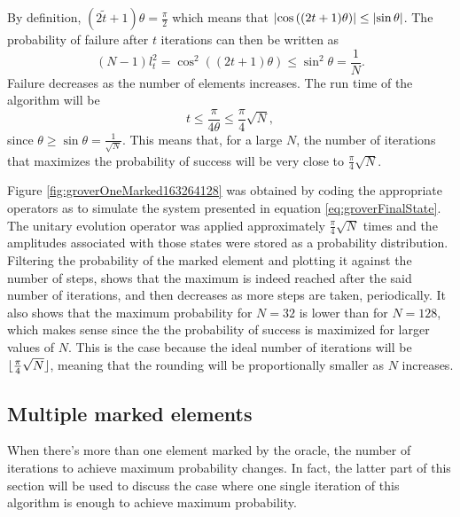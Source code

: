 \documentclass[../../dissertation.tex]{subfiles}
\begin{document}
By definition, $(2\widetilde{t}+1)\theta = \frac{\pi}{2}$ which means that
$\abs{\cos{((2t+1)}\theta)} \leq \abs{\sin{\theta}}$. The probability of
failure after $t$ iterations can then be written as
\begin{equation}
	(N-1)l_t^2 = \cos^2{((2t+1)\theta)} \leq \sin^2\theta = \frac{1}{N}.
\end{equation}
Failure decreases as the number of elements increases. The run time of the algorithm will be
\begin{equation}
	t \leq \frac{\pi}{4\theta} \leq \frac{\pi}{4}\sqrt{N},
\end{equation}
since $\theta \geq \sin\theta = \frac{1}{\sqrt{N}}$. This means that, for a
large $N$, the number of iterations that maximizes the probability of success
will be very close to $\frac{\pi}{4}\sqrt{N}$.\par 
Figure \ref{fig:groverOneMarked163264128} was obtained by coding the appropriate
operators as to simulate the system presented in equation
\eqref{eq:groverFinalState}. 
The unitary evolution operator was applied approximately
$\frac{\pi}{4}\sqrt{N}$ times and the amplitudes associated with those states
were stored as a probability distribution. Filtering the probability of the
marked element and plotting it against the number of steps, shows that the
maximum is indeed reached after the said number of iterations, and then decreases as more steps are taken, periodically. It also shows
that the maximum probability for $N=32$ is lower than for $N=128$, which makes
sense since the the probability of success is maximized for larger values of
$N$. This is the case because the ideal number of iterations will be $\lfloor\frac{\pi}{4}\sqrt{N}\rfloor$, meaning that the rounding will be proportionally smaller as $N$ increases.

\subsection{Multiple marked elements}
When there's more than one element marked by the oracle, the number of
iterations to achieve maximum probability changes. In fact, the latter part of
this section will be used to discuss the case where one single iteration of
this algorithm is enough to achieve maximum probability.\par 
\end{document}
